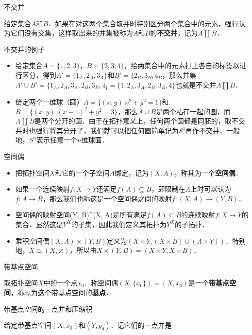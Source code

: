 
\begin{definition}{不交并}

给定集合$A$和$B$．如果在对这两个集合取并时特别区分两个集合中的元素，强行认为它们没有交集，这样取出来的并集被称为$A$和$B$的\textbf{不交并}，记为$A\amalg B$．

\end{definition}

\begin{example}{不交并的例子}
\begin{itemize}
\item 给定集合$A=\{1,2,3\}$，$B=\{2,3,4\}$，给两集合中的元素打上各自的标签以进行区分，得到$A'=\{1_A, 2_A, 3_A\}$和$B'=\{2_B, 3_B, 4_B$，那么并集$A'\cup B'=\{1_A, 2_A, 3_A, 2_B, 3_B, 4_\}=\{1, 2_A, 3_A, 2_B, 3_B, 4\}$也就是不交并$A\amalg B$．
\item 给定两个一维球（圆）$A=\{(x, y)|x^2+y^2=1\}$和$B=\{(x, y)|(x-1)^2+y^2=3\}$，那么$A\cup B$是两个粘在一起的圆，而$A\amalg B$是两个分开的圆．由于在拓扑意义上，任何两个圆都是同胚的，取不交并时也强行将其分开了，我们就可以把任何圆简单记为$S^1$再作不交并．一般地，$S^n$表示任意一个$n$维球面．

\end{itemize}
\end{example}

\begin{definition}{空间偶}
\begin{itemize}
\item 把拓扑空间$X$和它的一个子空间$A$绑定，记为$(X, A)$，称其为一个\textbf{空间偶}．
\item 如果一个连续映射$f:X\rightarrow Y$还满足$f(A)\subseteq B$，即限制在$A$上时可以认为$f:A\rightarrow B$，那么我们也称这是一个空间偶之间的映射$f:(X, A)\rightarrow(Y, B)$．
\item 空间偶的映射空间(Y, B)^{(X, A)}是所有满足$f(A)\subseteq B$的连续映射$f:X\rightarrow Y$的集合．显然这是$Y^X$的子集，因此我们定义其拓扑为$Y^X$的子拓扑．
\item 乘积空间偶$(X, A)\times(Y,B)$定义为$(X\times Y, (X\times B)\cup(A\times Y))$．特别地，$X\cong(X, \varnothing)$，所以由$X\times(Y, B)=(X\times Y, X\times B)$．


\end{itemize}
\end{definition}

\begin{definition}{带基点空间}

取拓扑空间$X$中的一个点$x_0$．称空间偶$(X, \{x_0\})=(X, x_0)$是一个\textbf{带基点空间}，称$x_0$为这个带基点空间的\textbf{基点}．

\end{definition}

\begin{definition}{带基点空间的一点并和压缩积}

给定带基点空间$(X, x_0)$和$(Y, y_0)$．记它们的一点并是


\end{definition}
